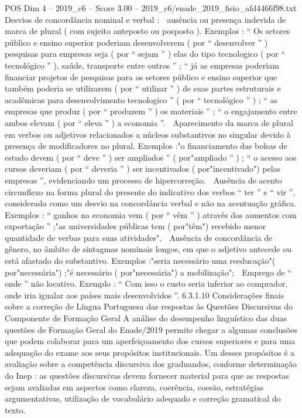 \begin{textsample}{POS Dim 4 – 2019\_c6 – Score 3.00 – 2019\_c6/enade\_2019\_fisio\_afd4466f98.txt}
Desvios de concordância nominal e verbal :  ausência ou presença indevida de marca de plural ( com sujeito anteposto ou posposto ).
Exemplos : “ Os setores público e ensino superior poderiam desenvolverem ( por “ desenvolver ” ) pesquisas para empresas seja ( por “ sejam ” ) elas do tipo tecnologico ( por “ tecnológico ” ), saúde, transporte entre outros ” ; “ já as empresas poderiam financiar projetos de pesquisas para os setores público e ensino superior que também poderia se utilizarem ( por “ utilizar ” ) de suas partes estruturais e acadêmicas para desenvolvimento tecnologico ” ( por “ tecnológico ” ) ; “ as empresas que produz ( por “ produzem ” ) os materiais ” ; “ o engajamento entre ambos elevam ( por “ eleva ” ) a economia ”.  Aparecimento da marca de plural em verbos ou adjetivos relacionados a núcleos substantivos no singular devido à presença de modificadores no plural.
Exemplos :"o financiamento das bolsas de estudo devem ( por “ deve ” ) ser ampliados ” ( por"ampliado ” ) ; “ o acesso aos cursos deveriam ( por “ deveria ” ) ser incentivados ( por"incentivado") pelas empresas ”, evidenciando um processo de hipercorreção.  Ausência de acento circunflexo na forma plural do presente do indicativo dos verbos “ ter ” e “ vir ”, considerada como um desvio na concordância verbal e não na acentuação gráfica.
Exemplos : “ ganhos na economia vem ( por “ vêm ” ) através dos aumentos com exportação ” ;"as universidades públicas tem ( por"têm") recebido menor quantidade de verbas para suas atividades".  Ausência de concordância de gênero, no âmbito de sintagmas nominais longos, em que o adjetivo antecede ou está afastado do substantivo.
Exemplos :"seria necessário uma reeducação"( por"necessária") ;"é necessário ( por"necessária") a mobilização";  Emprego de “ onde ” não locativo.
Exemplo : “ Com isso o custo seria inferior ao comprador, onde iria igualar aos países mais desenvolvidos ”. 6.3.1.10 Considerações finais sobre a correção de Língua Portuguesa das respostas às Questões Discursivas do Componente de Formação Geral A análise do desempenho linguístico das duas questões de Formação Geral do Enade/2019 permite chegar a algumas conclusões que podem colaborar para um aperfeiçoamento dos cursos superiores e para uma adequação do exame aos seus propósitos institucionais.
Um desses propósitos é a avaliação sobre a competência discursiva dos graduandos, conforme determinação do Inep : as questões discursivas devem fornecer material para que as respostas sejam avaliadas em aspectos como clareza, coerência, coesão, estratégias argumentativas, utilização de vocabulário adequado e correção gramatical do texto.

\end{textsample}
